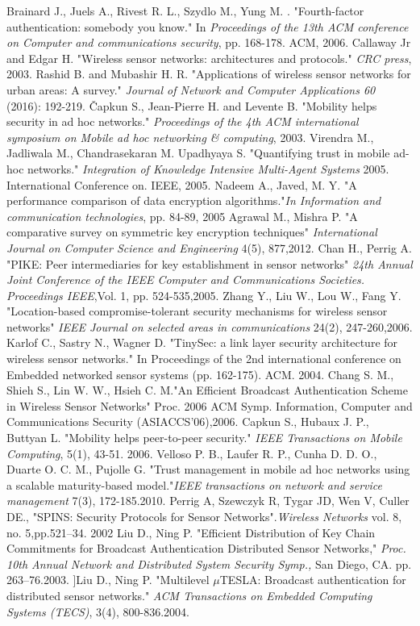 \documentclass[sigconf]{acmart}
\begin{document}
\begin{thebibliography}{99}
Brainard J., Juels A., Rivest R. L., Szydlo M., Yung M. . "Fourth-factor authentication: somebody you know." In \textit{Proceedings of the 13th ACM conference on Computer and communications security}, pp. 168-178. ACM, 2006.
Callaway Jr and Edgar H. "Wireless sensor networks: architectures and protocols." \textit{CRC press}, 2003.
Rashid B. and Mubashir H. R. "Applications of wireless sensor networks for urban areas: A survey." \textit{Journal of Network and Computer Applications 60} (2016): 192-219.
Čapkun S., Jean-Pierre H. and Levente B. "Mobility helps security in ad hoc networks." \textit{Proceedings of the 4th ACM international symposium on Mobile ad hoc networking \& computing}, 2003.
Virendra M., Jadliwala M., Chandrasekaran M. Upadhyaya S. "Quantifying trust in mobile ad-hoc networks." \textit{Integration of Knowledge Intensive Multi-Agent Systems} 2005. International Conference on. IEEE, 2005.
Nadeem A.,  Javed, M. Y. "A performance comparison of data encryption algorithms."\textit{In Information and communication technologies}, pp. 84-89, 2005
Agrawal M.,  Mishra P. "A comparative survey on symmetric key encryption techniques" \textit{ International Journal on Computer Science and Engineering} 4(5), 877,2012.
Chan H., Perrig A. "PIKE: Peer intermediaries for key establishment in sensor networks" \textit{24th Annual Joint Conference of the IEEE Computer and Communications Societies. Proceedings IEEE},Vol. 1, pp. 524-535,2005.
Zhang Y., Liu W., Lou W., Fang Y. "Location-based compromise-tolerant security mechanisms for wireless sensor networks" \textit{IEEE Journal on selected areas in communications} 24(2), 247-260,2006.
Karlof C., Sastry N., Wagner D. "TinySec: a link layer security architecture for wireless sensor networks." In Proceedings of the 2nd international conference on Embedded networked sensor systems (pp. 162-175). ACM. 2004.
Chang S. M., Shieh S., Lin W. W., Hsieh C. M."An Efficient Broadcast Authentication Scheme in Wireless Sensor Networks" Proc. 2006 ACM Symp. Information, Computer and Communications Security (ASIACCS’06),2006.
Capkun S., Hubaux J. P., Buttyan L. "Mobility helps peer-to-peer security." \textit{IEEE Transactions on Mobile Computing}, 5(1), 43-51. 2006.
Velloso P. B., Laufer R. P., Cunha D. D. O., Duarte O. C. M., Pujolle G. "Trust management in mobile ad hoc networks using a scalable maturity-based model."\textit{IEEE transactions on network and service management} 7(3), 172-185.2010.
Perrig A, Szewczyk R, Tygar JD, Wen V, Culler DE., "SPINS: Security Protocols for Sensor Networks".\textit{Wireless Networks} vol. 8, no. 5,pp.521–34. 2002
 Liu D., Ning P. "Efficient Distribution of Key Chain Commitments for Broadcast Authentication Distributed Sensor Networks," \textit{Proc. 10th Annual Network and Distributed System Security Symp.,} San Diego, CA. pp. 263–76.2003.
]Liu D., Ning P. "Multilevel $\mu$TESLA: Broadcast authentication for distributed sensor networks." \textit{ACM Transactions on Embedded Computing Systems (TECS)}, 3(4), 800-836.2004.
\end{thebibliography}
\end{document}
